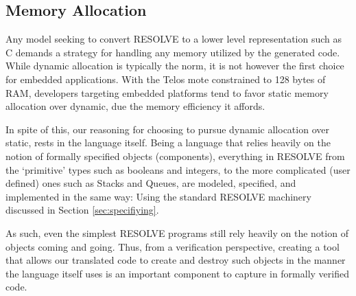 
\subsection{Memory Allocation}\label{sec:mem}

Any model seeking to convert RESOLVE to a lower level representation such as C demands a strategy for handling any memory utilized by the generated code. While dynamic allocation is typically the norm, it is not however the first choice for embedded applications. With the Telos mote constrained to 128 bytes of RAM, developers targeting embedded platforms tend to favor static memory allocation over dynamic, due the memory efficiency it affords. 


In spite of this, our reasoning for choosing to pursue dynamic allocation over static, rests in the language itself. Being a language that relies heavily on the notion of formally specified objects (components), everything in RESOLVE from the `primitive' types such as booleans and integers, to the more complicated (user defined) ones such as Stacks and Queues, are modeled, specified, and implemented in the same way: Using the standard RESOLVE machinery discussed in Section \ref{sec:specifiying}. 

As such, even the simplest RESOLVE programs still rely heavily on the notion of objects coming and going. Thus, from a verification perspective, creating a tool that allows our translated code to create and destroy such objects in the manner the language itself uses is an important component to capture in formally verified code.

